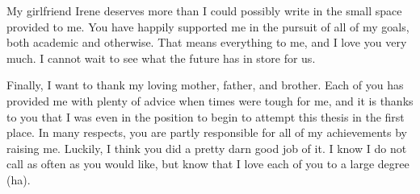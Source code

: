 \documentclass{ucbthesis}
\begin{document}
\begin{frontmatter}
\begin{acknowledgements}
My girlfriend Irene deserves more than I could possibly write in the small space provided to me. 
You have happily supported me in the pursuit of all of my goals, both academic and otherwise. 
That means everything to me, and I love you very much. I cannot wait to see what the future has in store for us. 

Finally, I want to thank my loving mother, father, and brother. 
Each of you has provided me with plenty of advice when times were tough for me, and it is thanks to you that I was even in the position to begin to attempt this thesis in the first place.
In many respects, you are partly responsible for all of my achievements by raising me. 
Luckily, I think you did a pretty darn good job of it. 
I know I do not call as often as you would like, but know that I love each of you to a large degree (ha). 
\end{acknowledgements}

\end{frontmatter}

\pagestyle{headings}










\printbibliography
\end{document}
